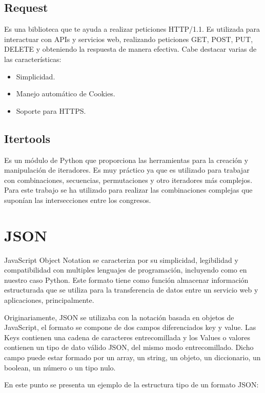 \documentclass[a4paper, 12pt]{book}
\begin{document}
\subsection{Request}
Es una biblioteca que te ayuda a realizar peticiones HTTP/1.1. Es utilizada para interactuar con APIs y servicios web, realizando peticiones GET, POST, PUT, DELETE y obteniendo la respuesta de manera efectiva. Cabe destacar varias de las características:

\begin{itemize}
    \item Simplicidad.
    \item Manejo automático de Cookies.
    \item Soporte para HTTPS.
\end{itemize}


\subsection{Itertools}
Es un módulo de Python que proporciona las herramientas para la creación y manipulación de iteradores. Es muy práctico ya que es utilizado para trabajar con combinaciones, secuencias, permutaciones y otro iteradores más complejos. Para este trabajo se ha utilizado para realizar las combinaciones complejas que suponían las intersecciones entre los congresos.


\section{JSON} 
\label{sec:seccion1}

JavaScript Object Notation se caracteriza por su simplicidad, legibilidad y compatibilidad con multiples lenguajes de programación, incluyendo como en nuestro caso Python.
Este formato tiene como función almacenar información estructurada que se utiliza para la transferencia de datos entre un servicio web y aplicaciones, principalmente.

Originariamente, JSON se utilizaba con la notación basada en objetos de JavaScript, el formato se compone de dos campos diferenciados key y value.
Las Keys contienen una cadena de caracteres entrecomillada y los Values o valores contienen un tipo de dato válido JSON, del mismo modo entrecomillado. Dicho campo puede estar formado por un array, un string, un objeto, un diccionario, un boolean, un número o un tipo nulo.

En este punto se presenta un ejemplo de la estructura tipo de un formato JSON:
\end{document}
